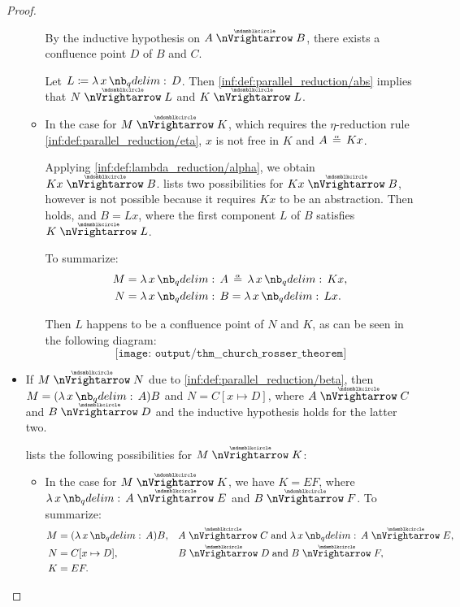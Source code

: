 \begin{proof}
\begin{itemize}
\begin{itemize}
      By the inductive hypothesis on \( A \ppred B \), there exists a confluence point \( D \) of \( B \) and \( C \).

      Let \( L \coloneqq \qabs x D \). Then \ref{inf:def:parallel_reduction/abs} implies that \( N \ppred L \) and \( K \ppred L \).

      \item In the case  for \( M \ppred K \), which requires the \( \eta \)-reduction rule \ref{inf:def:parallel_reduction/eta}, \( x \) is not free in \( K \) and \( A \aequiv Kx \).

      Applying \ref{inf:def:lambda_reduction/alpha}, we obtain \( Kx \ppred B \).  lists two possibilities for \( Kx \ppred B \), however  is not possible because it requires \( Kx \) to be an abstraction. Then  holds, and \( B = Lx \), where the first component \( L \) of \( B \) satisfies \( K \ppred L \).

      To summarize:
      \begin{align*}
        M &= \qabs x A \aequiv \qabs x Kx, \\
        N &= \qabs x B = \qabs x Lx. \\
      \end{align*}

      Then \( L \) happens to be a confluence point of \( N \) and \( K \), as can be seen in the following diagram:
      \begin{equation*}
        \texttt{[image: output/thm\_\_church\_rosser\_theorem]}
      \end{equation*}
    \end{itemize}

    \item If \( M \ppred N \) due to \ref{inf:def:parallel_reduction/beta}, then \( M = (\qabs x A)B \) and \( N = C[x \mapsto D] \), where \( A \ppred C \) and \( B \ppred D \) and the inductive hypothesis holds for the latter two.

     lists the following possibilities for \( M \ppred K \):
    \begin{itemize}
      \item In the case  for \( M \ppred K \), we have \( K = EF \), where \( \qabs x A \ppred E \) and \( B \ppred F \). To summarize:
      \begin{align*}
        M &= (\qabs x A) B,           &&A \ppred C \T{and} \qabs x A \ppred E, \\
        N &= C[x \mapsto D],          &&B \ppred D \T{and} B \ppred F, \\
        K &= E F.                     &&
      \end{align*}


\end{itemize}
\end{itemize}
\end{proof}

